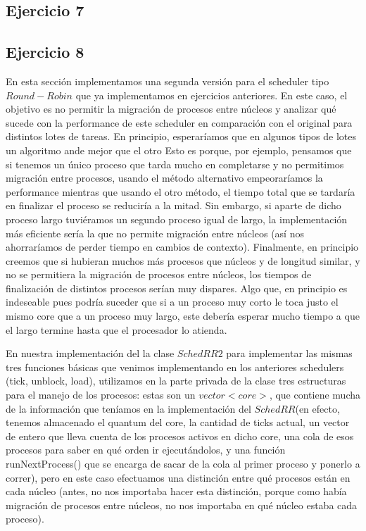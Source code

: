 \documentclass[11pt, a4paper, twoside]{article}
\begin{document}
\clearpage
\subsection{Ejercicio 7}






\clearpage
\subsection{Ejercicio 8}
En esta sección implementamos una segunda versión para el scheduler tipo $Round-Robin$ que ya implementamos
en ejercicios anteriores. En este caso, el objetivo es no permitir la migración de procesos entre núcleos y
analizar qué sucede con la performance de este scheduler en comparación con el original para distintos lotes
de tareas. En principio, esperaríamos que en algunos tipos de lotes un algoritmo ande mejor que el otro
Esto es porque, por ejemplo, pensamos que si tenemos un 
único proceso que tarda mucho en completarse y no permitimos migración entre procesos, usando el método 
alternativo empeoraríamos la performance mientras que usando el otro método, el tiempo total que se tardaría
en finalizar el proceso se reduciría a la mitad. Sin embargo, si aparte de dicho proceso largo tuviéramos un
segundo proceso igual de largo, la implementación más eficiente sería la que no permite migración entre 
núcleos (así nos ahorraríamos de perder tiempo en cambios de contexto). Finalmente, en principio creemos que
si hubieran muchos más procesos que núcleos y de longitud similar, 
y no se permitiera la migración de procesos entre núcleos, los tiempos de finalización de distintos 
procesos serían muy dispares. Algo que, en principio es indeseable pues podría suceder que si a un proceso muy 
corto le toca justo el mismo core que a un proceso muy largo, este debería esperar mucho tiempo a que el largo
termine hasta que el procesador lo atienda. 

En nuestra implementación del la clase $SchedRR2$ para implementar las mismas tres funciones básicas que venimos
implementando en los anteriores schedulers (tick, unblock, load), utilizamos en la parte privada de la clase tres
estructuras para el manejo de los procesos: estas son un $vector<core>$, que contiene mucha de la información 
que teníamos en la implementación del $SchedRR$(en efecto, tenemos almacenado el quantum del core, la cantidad de
ticks actual, un vector de entero que lleva cuenta de los procesos activos en dicho core, una cola de esos procesos para
saber en qué orden ir ejecutándolos, y una función runNextProcess() que se encarga de sacar de la cola al
primer proceso y ponerlo a correr), pero en este caso efectuamos una distinción entre qué procesos están en cada
núcleo (antes, no nos importaba hacer esta distinción, porque como había migración de procesos entre 
núcleos, no nos importaba en qué núcleo estaba cada proceso). 
\end{document}
